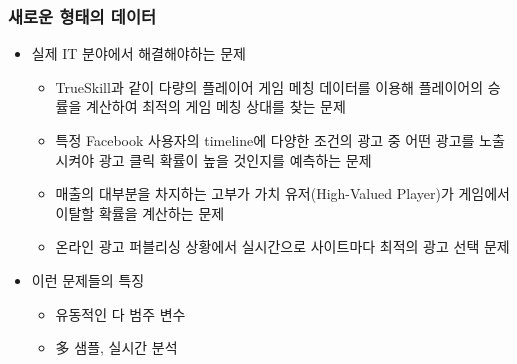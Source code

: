 \documentclass{beamer}
\begin{document}
\begin{frame}
\frametitle{새로운 형태의 데이터}

\begin{itemize}
\item 실제  IT 분야에서 해결해야하는 문제

    \begin{itemize}
    [circle]
    \item TrueSkill과 같이 다량의 플레이어 게임 메칭 데이터를 이용해 플레이어의 승률을 계산하여 최적의 게임 메칭 상대를 찾는 문제
    \item 특정 Facebook 사용자의 timeline에 다양한 조건의 광고 중 어떤 광고를 노출 시켜야 광고 클릭 확률이 높을 것인지를 예측하는 문제
    \item 매출의 대부분을 차지하는 고부가 가치 유저(High-Valued Player)가 게임에서 이탈할 확률을 계산하는 문제
    \item 온라인 광고 퍼블리싱 상황에서 실시간으로 사이트마다 최적의 광고 선택 문제
    \end{itemize}

\item 이런 문제들의 특징
    \begin{itemize}
    [circle]
    \item 유동적인 다 범주 변수
    \item 多  샘플, 실시간 분석
    \end{itemize}
\end{itemize}

\end{frame}
\end{document}
